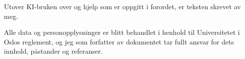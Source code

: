 \medskip
\noindent Utover KI-bruken over og hjelp som er oppgitt i forordet, er teksten skrevet av meg.

\smallskip
\noindent Alle data og personopplysninger er blitt behandlet i henhold til Universitetet i Oslos reglement, og jeg som forfatter av dokumentet tar fullt ansvar for dets innhold, påstander og referanser.
